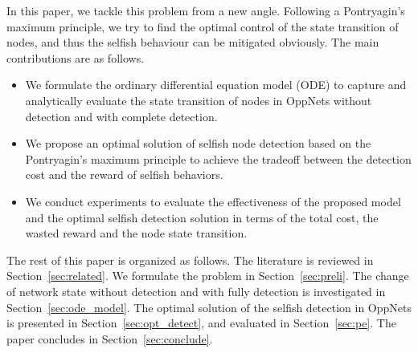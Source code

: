 In this paper,
we tackle this problem from a new angle.
Following a Pontryagin's maximum principle,
we try to find the optimal control
of the state transition of nodes,
and thus the selfish behaviour can be
mitigated obviously.
The main contributions are as follows.

\begin{itemize}
\item {We formulate the ordinary differential equation model (ODE)
to capture and analytically evaluate the state transition of nodes
in OppNets without detection and with complete detection.}
\item {We propose an optimal solution of selfish node detection
based on the Pontryagin's maximum principle
to achieve the tradeoff between the detection cost
and the reward of selfish behaviors.}
\item {We conduct experiments to evaluate
the effectiveness of the proposed model
and the optimal selfish detection solution
in terms of the total cost, the wasted reward and the node state transition.}
\end{itemize}

The rest of this paper is organized as follows.
The literature is reviewed in Section~\ref{sec:related}.
We formulate the problem in Section~\ref{sec:preli}.
The change of network state without detection and with fully detection
is investigated in Section~\ref{sec:ode_model}.
The optimal solution of the selfish detection in OppNets
is presented in Section~\ref{sec:opt_detect},
and evaluated in Section~\ref{sec:pe}.
The paper concludes in Section~\ref{sec:conclude}.
